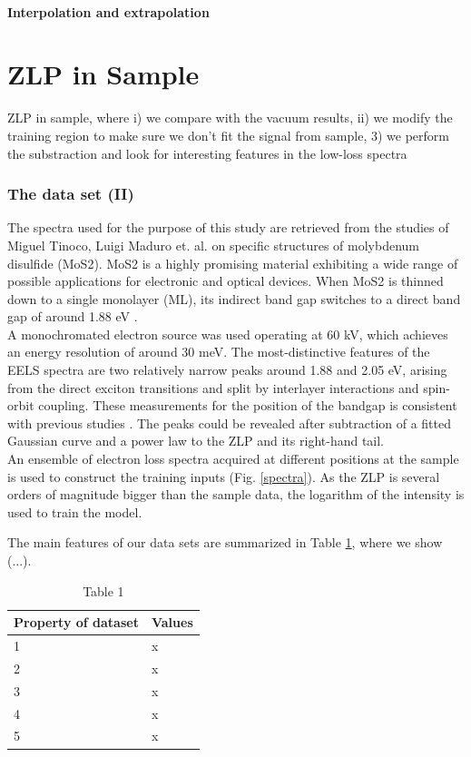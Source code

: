 \documentclass[11pt,a4paper]{article}
\numberwithin{equation}{section}
\numberwithin{figure}{section}
\numberwithin{table}{section}
\begin{document}
\subsection{Interpolation and extrapolation}


\newpage
\part{ZLP in Sample}

ZLP in sample, where i) we compare with the vacuum results, ii) we modify the training region to make sure we don't fit the signal from sample, 3) we perform the substraction and look for interesting features in the low-loss spectra

\section{The data set (II)}

The spectra used for the purpose of this study are retrieved from the studies of Miguel Tinoco, Luigi Maduro et. al. \cite{soniamos2} on specific structures of molybdenum disulfide (MoS2). MoS2 is a highly promising material exhibiting a wide range of possible applications for electronic and optical devices. When MoS2 is thinned down to a single monolayer (ML), its indirect band gap switches to a direct band gap of around 1.88 eV \cite{Nerl:2016}. \\
A monochromated electron source was used operating at 60 kV, which achieves an energy resolution of around 30 meV. The most-distinctive features of the EELS spectra are two relatively narrow peaks around 1.88 and 2.05 eV, arising from the direct exciton transitions and split by interlayer interactions and spin-orbit coupling. These measurements for the position of the bandgap is consistent with previous studies \cite{Nerl:2016, Komsa:2012}. The peaks could be revealed after subtraction of a fitted Gaussian curve and a power law to the ZLP and its right-hand tail. \\

An ensemble of electron loss spectra acquired at different positions at the sample is used to construct the training inputs (Fig. \ref{spectra}). As the ZLP is several orders of magnitude bigger than the sample data, the logarithm of the intensity is used to train the model.

The main features of our data sets are summarized in Table \ref{table:spectra}, where we show (...). 

\begin{table}[H]
\centering
\begin{tabular}{|l|l|}
\hline
Property of dataset & Values \\ \hline
1                   & x      \\ \hline
2                   & x      \\ \hline
3                   & x      \\ \hline
4                   & x      \\ \hline
5                   & x      \\ \hline
\end{tabular}
\caption{Table 1}
\label{table:spectra}
\end{table}
\end{document}
